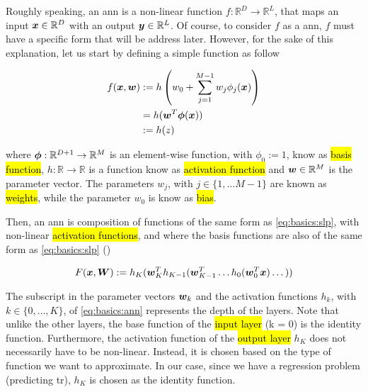 
\glsresetall

\graphicspath{{./Sections/Basics/Resources/}}


Roughly speaking, an \gls{ann} is a non-linear function $f:\mathbb{R}^D \rightarrow \mathbb{R}^L$, that maps an input $\boldsymbol{x}\in\mathbb{R}^D$ with an output $\boldsymbol{y}\in\mathbb{R}^L$. Of course, to consider $f$ as a \gls{ann}, $f$ must have a specific form that will be address later. However, for the sake of this explanation, let us start by defining a simple function as follow

\begin{equation}
  \begin{split}
    f(\boldsymbol{x},\boldsymbol{w}) &:= h \left(w_0 + \sum_{j=1}^{M-1}w_j\phi_j(\boldsymbol{x}) \right) \\
    &= h(\boldsymbol{w}^T\boldsymbol{\phi}(\boldsymbol{x})) \\
    &:= h(z)
  \end{split}
  \label{eq:basics:slp}
\end{equation}

\noindent where $\boldsymbol{\phi}:\mathbb{R}^{D+1} \rightarrow \mathbb{R}^M$ is an element-wise function, with $\phi_0:=1$, know as \hl{basis function}, $h:\mathbb{R} \rightarrow \mathbb{R}$ is a function know as \hl{activation function} and $\boldsymbol{w}\in\mathbb{R}^M$ is the parameter vector. The parameters $w_j$, with $j\in\{1,\dots M-1\}$ are known as \hl{weights}, while the parameter $w_0$ is know as \hl{bias}.

Then, an \gls{ann} is composition of functions of the same form as \ref{eq:basics:slp}, with non-linear \hl{activation functions}, and where the basis functions are also of the same form as \ref{eq:basics:slp} (\cite{bishop2006pattern})

\begin{equation}
  F(\boldsymbol{x}, \boldsymbol{W}) :=
  h_K(\boldsymbol{w}^T_K h_{K-1}(\boldsymbol{w}^T_{K-1} \dots h_{0}(\boldsymbol{w}^T_0 \boldsymbol{x}) \dots ))
  \label{eq:basics:ann}
\end{equation}

The subscript in the parameter vectors $\boldsymbol{w}_k$ and the activation functions $h_k$, with $k\in\{0, \dots, K\}$, of \ref{eq:basics:ann} represents the depth of the layers. Note that unlike the other layers, the base function of the \hl{input layer} (k = 0) is the identity function. Furthermore, the activation function of the \hl{output layer} $h_K$ does not necessarily have to be non-linear. Instead, it is chosen based on the type of function we want to approximate. In our case, since we have a regression problem (predicting \gls{tr}), $h_K$ is chosen as the identity function.

